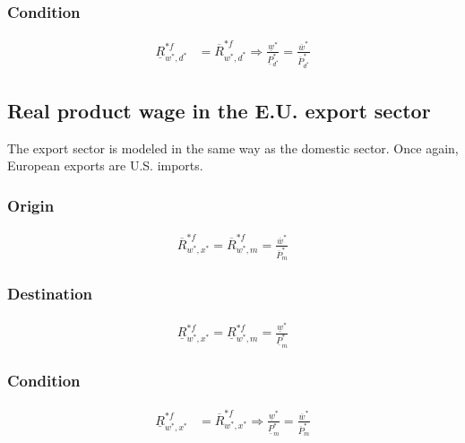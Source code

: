 \subsubsection*{Condition}
\begin{equation}\label{prodweu.con} 
\begin{aligned}
    \underline R^{*f}_{w^*, d^*} &= \overline R^{*f}_{w^*, d^*} \Rightarrow \frac{\underline w^*}{\underline P^*_{d^*}} = \frac{\overline w^*}{\overline P^*_{d^*}}
\end{aligned}  
\end{equation}

\subsection*{Real product wage in the E.U. export sector}
The export sector is modeled in the same way as the domestic sector. Once again, European exports are U.S. imports.
\subsubsection*{Origin}
\begin{equation}\label{proxweu.o} 
\begin{aligned}
\overline R^{*f}_{w^*, x^*} = \overline R^{*f}_{w^*, m} = \frac{\overline w^*}{\overline P^*_{m}}
\end{aligned}  
\end{equation}

\subsubsection*{Destination}
\begin{equation}\label{proxweu.d}  
\begin{aligned}
\underline R^{*f}_{w^*, x^*} = \underline R^{*f}_{w^*, m} = \frac{\underline w^*}{\underline P^*_{m}}
\end{aligned}  
\end{equation}

\subsubsection*{Condition}
\begin{equation}\label{proxweu.con}  
\begin{aligned}
    \underline R^{*f}_{w^*, x^*} &= \overline R^{*f}_{w^*, x^*} \Rightarrow \frac{\underline w^*}{\underline P^*_{m}} = \frac{\overline w^*}{\overline P^*_{m}}
\end{aligned}  
\end{equation}
